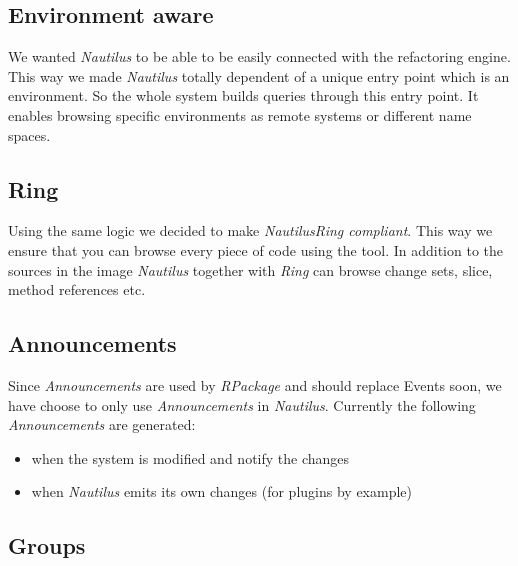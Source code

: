 \documentclass[a4paper,10pt,twoside]{book}
\newcommand\nautilus{\emph{Nautilus}\xspace}
\begin{document}
\subsection*{Environment aware}

We wanted \nautilus to be able to be easily connected with the refactoring engine. This way we made \nautilus totally dependent of a unique entry point which is an environment. So the whole system builds queries through this entry point. It enables browsing specific environments as remote systems or different name spaces.

\subsection*{Ring}

Using the same logic we decided to make \nautilus \emph{Ring compliant}. This way we ensure that you can browse every piece of code using the tool. In addition to the sources in the image \nautilus together with \emph{Ring} can browse change sets, slice, method references etc.

\subsection*{Announcements}

Since \emph{Announcements} are used by \emph{RPackage} and should replace Events soon, we have choose to only use \emph{Announcements} in \nautilus. Currently the following \emph{Announcements} are generated:
\begin{itemize}
    \item when the system is modified and notify the changes
	\item when \nautilus emits its own changes (for plugins by example)
\end{itemize}

\subsection*{Groups}
\end{document}
